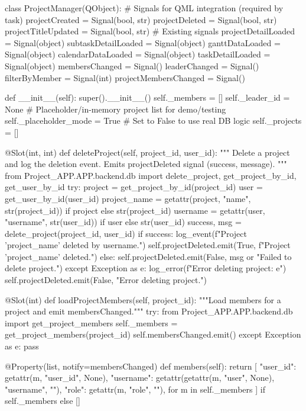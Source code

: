 \documentclass{report}
\begin{document}
\begin{python}
class ProjectManager(QObject):
    # Signals for QML integration (required by task)
    projectCreated = Signal(bool, str)
    projectDeleted = Signal(bool, str)
    projectTitleUpdated = Signal(bool, str)
    # Existing signals
    projectDetailLoaded = Signal(object)
    subtaskDetailLoaded = Signal(object)
    ganttDataLoaded = Signal(object)
    calendarDataLoaded = Signal(object)
    taskDetailLoaded = Signal(object)
    membersChanged = Signal()
    leaderChanged = Signal()
    filterByMember = Signal(int)
    projectMembersChanged = Signal()

    def __init__(self):
        super().__init__()
        self._members = []
        self._leader_id = None
        # Placeholder/in-memory project list for demo/testing
        self._placeholder_mode = True  # Set to False to use real DB logic
        self._projects = []

    @Slot(int, int)
    def deleteProject(self, project_id, user_id):
        """
        Delete a project and log the deletion event.
        Emits projectDeleted signal (success, message).
        """
        from Project_APP.APP.backend.db import delete_project, get_project_by_id, get_user_by_id
        try:
            project = get_project_by_id(project_id)
            user = get_user_by_id(user_id)
            project_name = getattr(project, "name", str(project_id)) if project else str(project_id)
            username = getattr(user, "username", str(user_id)) if user else str(user_id)
            success, msg = delete_project(project_id, user_id)
            if success:
                log_event(f"Project '{project_name}' deleted by {username}.")
                self.projectDeleted.emit(True, f"Project '{project_name}' deleted.")
            else:
                self.projectDeleted.emit(False, msg or "Failed to delete project.")
        except Exception as e:
            log_error(f"Error deleting project: {e}")
            self.projectDeleted.emit(False, "Error deleting project.")

    @Slot(int)
    def loadProjectMembers(self, project_id):
        """Load members for a project and emit membersChanged."""
        try:
            from Project_APP.APP.backend.db import get_project_members
            self._members = get_project_members(project_id)
            self.membersChanged.emit()
        except Exception as e:
            pass

    @Property(list, notify=membersChanged)
    def members(self):
        return [
            {
                "user_id": getattr(m, "user_id", None),
                "username": getattr(getattr(m, "user", None), "username", ""),
                "role": getattr(m, "role", ""),
            }
            for m in self._members
        ] if self._members else []


\end{python}
\end{document}
